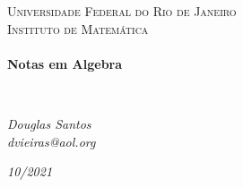 \begin{titlepage}
\begin{center}
\textsc{\Large Universidade Federal do Rio de Janeiro}\\
\textsc{\large Instituto de Matemática}\\[1.5cm]
\LinhaR \\[0.4cm]
{ \LARGE \bfseries Notas em Algebra \\[0.4cm]}

\LinhaR \\[1.4cm]

\noindent
\begin{minipage}{0.4\textwidth}
\begin{center} \large
\emph{Douglas Santos}\\
\itshape{dvieiras@aol.org}
\end{center}
\end{minipage}

\begin{center}
\end{center}

\vfill
{\large \textit{10/2021}}

\end{center}
\end{titlepage}
\clearpage